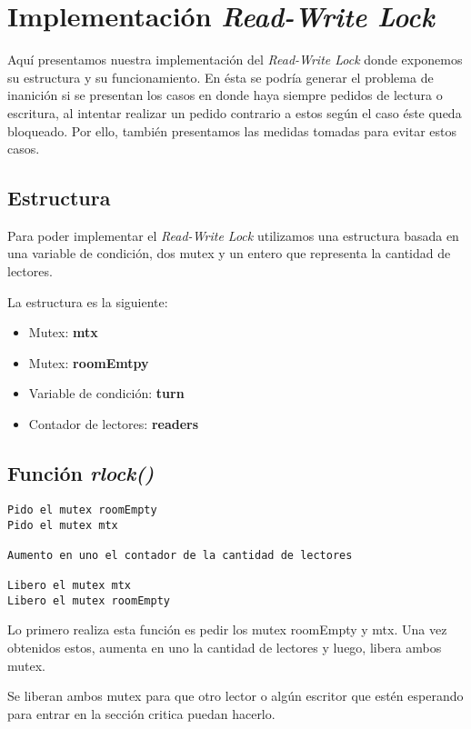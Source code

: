 \section{Implementación \textit{Read-Write Lock}}

Aquí presentamos nuestra implementación del \textit{Read-Write Lock} donde exponemos su estructura y su funcionamiento. En ésta se podría generar el problema de inanición si se presentan los casos en donde haya siempre pedidos de lectura o escritura, al intentar realizar un pedido contrario a estos según el caso éste queda bloqueado. Por ello, también presentamos las medidas tomadas para evitar estos casos.


\subsection{Estructura}

Para poder implementar el \textit{Read-Write Lock} utilizamos una estructura basada en una variable de condición, dos mutex y un entero que representa la cantidad de lectores.

La estructura es la siguiente:

\begin{itemize}
	\item Mutex: \textbf{mtx}
	\item Mutex: \textbf{roomEmtpy}
	\item Variable de condición: \textbf{turn}
	\item Contador de lectores: \textbf{readers}
\end{itemize}


\subsection{Función \textit{rlock()}}

\begin{lstlisting}
Pido el mutex roomEmpty
Pido el mutex mtx

Aumento en uno el contador de la cantidad de lectores

Libero el mutex mtx
Libero el mutex roomEmpty
\end{lstlisting}

Lo primero realiza esta función es pedir los mutex roomEmpty y mtx. Una vez obtenidos estos, aumenta en uno la cantidad de lectores y luego, libera ambos mutex.

Se liberan ambos mutex para que otro lector o algún escritor que estén esperando para entrar en la sección critica puedan hacerlo.


